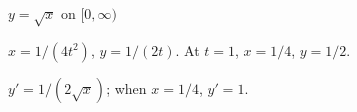 {$y=\sqrt{x}$ on $[0,\infty)$
}
{$x=1/(4t^2)$, $y=1/(2t)$. At $t=1$, $x=1/4$, $y=1/2$.

$y'=1/(2\sqrt{x})$; when $x=1/4$, $y'=1$.
}